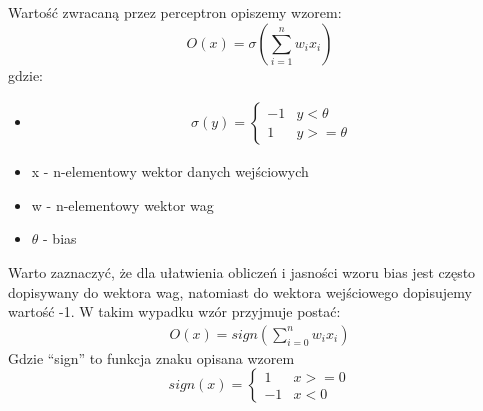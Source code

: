 \documentclass{article}
\begin{document}
Wartość zwracaną przez perceptron opiszemy wzorem:
\begin{equation*}
    O(x)=\sigma(\sum\limits_{i=1}^{n}{w_i x_i})
\end{equation*}
gdzie:
\begin{itemize}
    \item
          \begin{align*}
              \sigma(y)=
              \begin{cases}
                  -1 & y<\theta  \\
                  1  & y>=\theta
              \end{cases}
          \end{align*}
    \item x - n-elementowy wektor danych wejściowych
    \item w - n-elementowy wektor wag
    \item $\theta$ - bias
\end{itemize}

Warto zaznaczyć, że dla ułatwienia obliczeń i jasności wzoru bias jest często dopisywany do wektora wag, natomiast do wektora wejściowego dopisujemy wartość -1.
W takim wypadku wzór przyjmuje postać:
\begin{align*}
    O(x)=sign(\sum\limits_{i=0}^{n}{w_i x_i})
\end{align*}
Gdzie ``sign'' to funkcja znaku opisana wzorem
\begin{equation*}
    sign(x)=\begin{cases}
        1  & x>=0 \\
        -1 & x<0
    \end{cases}
\end{equation*}
\end{document}
